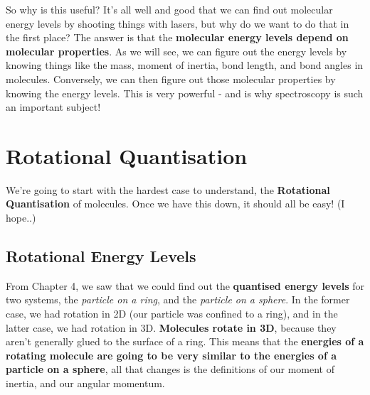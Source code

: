 \documentclass{memoir}[11pt,oneside,a4paper,openany]
\begin{document}
So why is this useful? It's all well and good that we can find out molecular energy levels by shooting things with lasers, but why do we want to do that in the first place? The answer is that the \textbf{molecular energy levels depend on molecular properties}. As we will see, we can figure out the energy levels by knowing things like the mass, moment of inertia, bond length, and bond angles in molecules. Conversely, we can then figure out those molecular properties by knowing the energy levels. This is very powerful - and is why spectroscopy is such an important subject! 

\section{Rotational Quantisation}
We're going to start with the hardest case to understand, the \textbf{Rotational Quantisation} of molecules. Once we have this down, it should all be easy! (I hope..)

\subsection{Rotational Energy Levels}
From Chapter 4, we saw that we could find out the \textbf{quantised energy levels} for two systems, the \emph{particle on a ring}, and the \emph{particle on a sphere}. In the former case, we had rotation in 2D (our particle was confined to a ring), and in the latter case, we had rotation in 3D. \textbf{Molecules rotate in 3D}, because they aren't generally glued to the surface of a ring. This means that the \textbf{energies of a rotating molecule are going to be very similar to the energies of a particle on a sphere}, all that changes is the definitions of our moment of inertia, and our angular momentum. 
\end{document}
